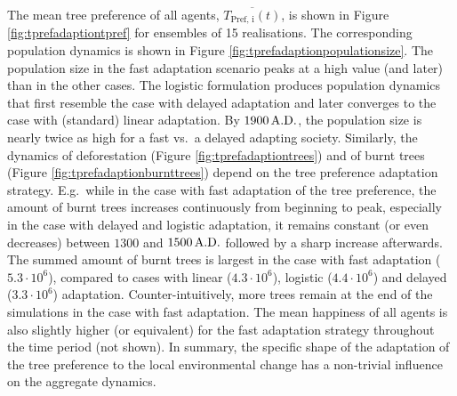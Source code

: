 The mean tree preference of all agents, $\overline{T_\text{Pref, i}(t)}$, is shown in Figure \ref{fig:tprefadaptiontpref} for ensembles of 15 realisations.
The corresponding population dynamics is shown in Figure \ref{fig:tprefadaptionpopulationsize}.
The population size in the fast adaptation scenario peaks at a high value (and later) than in the other cases.
The logistic formulation produces population dynamics that first resemble the case with delayed adaptation and later converges to the case with (standard) linear adaptation. 
By $1900\, {\rm A.D.}$, the population size is nearly twice as high for a fast vs.\ a delayed adapting society.
Similarly, the dynamics of deforestation (Figure \ref{fig:tprefadaptiontrees}) and of burnt trees (Figure \ref{fig:tprefadaptionburnttrees}) depend on the tree preference adaptation strategy. 
E.g.\ while in the case with fast adaptation of the tree preference, the amount of burnt trees increases continuously from beginning to peak, especially in the case with delayed and logistic adaptation, it remains constant (or even decreases) between $1300$ and $1500\,{\rm A.D.}$ followed by a sharp increase afterwards.
The summed amount of burnt trees is largest in the case with fast adaptation ($5.3\cdot 10^6$), compared to cases with linear ($4.3\cdot 10^6$), logistic ($4.4\cdot 10^6$) and delayed ($3.3\cdot 10^6$) adaptation.
Counter-intuitively, more trees remain at the end of the simulations in the case with fast adaptation.
The mean happiness of all agents is also slightly higher (or equivalent) for the fast adaptation strategy throughout the time period (not shown).
In summary, the specific shape of the adaptation of the tree preference to the local environmental change has a non-trivial influence on the aggregate dynamics.

